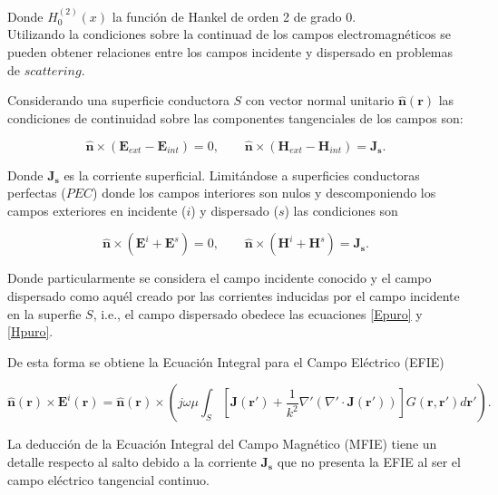 \documentclass[11pt,a4paper,twoside,pdf]{article}
\numberwithin{equation}{section}
\begin{document}
Donde $H^{(2)}_0(x)$ la función de Hankel de orden 2 de grado 0.\\

 



Utilizando la condiciones sobre la continuad de los campos electromagnéticos se pueden obtener relaciones entre los campos incidente y dispersado en problemas de $scattering$.

Considerando una superficie conductora $S$ con vector normal unitario $\mathbf{\hat{n}}(\mathbf{r})$ las condiciones de continuidad sobre las componentes tangenciales de los campos son:

\begin{equation}
    \mathbf{\hat{n}} \times (\mathbf{E}_{ext} - \mathbf{E}_{int}) = 0, \qquad \mathbf{\hat{n}} \times (\mathbf{H}_{ext} - \mathbf{H}_{int}) = \mathbf{J_s}.
\end{equation}

Donde $\mathbf{J_s}$ es la corriente superficial. Limitándose a superficies conductoras perfectas ($PEC$) donde los campos interiores son nulos y descomponiendo los campos exteriores en incidente ($i$) y dispersado ($s$) las condiciones son \cite{martin2021campo}

\begin{equation}
    \mathbf{\hat{n}} \times (\mathbf{E}^{i} + \mathbf{E}^{s}) = 0, \qquad \mathbf{\hat{n}} \times (\mathbf{H}^{i} + \mathbf{H}^{s}) = \mathbf{J_s}.
\end{equation}


Donde particularmente se considera el campo incidente conocido y el campo dispersado como aquél creado por las corrientes inducidas por el campo incidente en la superfie $S$, i.e., el campo dispersado obedece las ecuaciones \ref{Epuro} y \ref{Hpuro}.

De esta forma se obtiene la Ecuación Integral para el Campo Eléctrico (EFIE)



\begin{equation}
\mathbf{\hat{n}(\mathbf{r})} \times \mathbf{E}^i(\mathbf{r}) = \mathbf{\hat{n} (\mathbf{r})} \times \left( j\omega\mu \int_S \left[ \mathbf{J}(\mathbf{r}') + \frac{1}{k^2} \nabla' (\nabla' \cdot \mathbf{J}(\mathbf{r}')) \right] G(\mathbf{r}, \mathbf{r}') d\mathbf{r'} \right).
\label{EFIE}
\end{equation}


La deducción de la Ecuación Integral del Campo Magnético (MFIE) tiene un detalle respecto al salto debido a la corriente $\bm{J_s}$ que no presenta la EFIE al ser el campo eléctrico tangencial continuo. 
\end{document}
